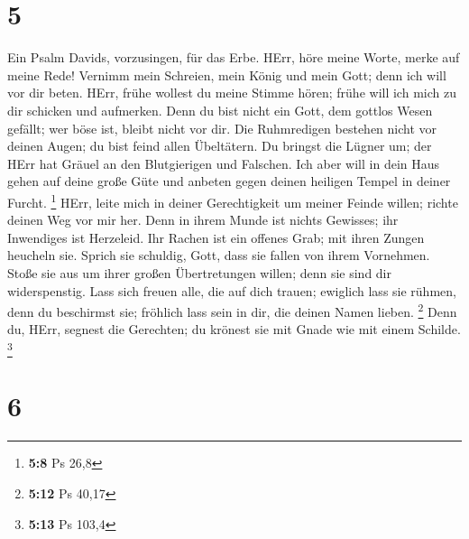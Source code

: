 \hypertarget{section-3}{%
\section{5}\label{section-3}}

 Ein Psalm Davids, vorzusingen, für das Erbe. 
HErr, höre meine Worte, merke auf meine Rede!  Vernimm mein
Schreien, mein König und mein Gott; denn ich will vor dir beten.
 HErr, frühe wollest du meine Stimme hören; frühe will ich
mich zu dir schicken und aufmerken.  Denn du bist nicht ein
Gott, dem gottlos Wesen gefällt; wer böse ist, bleibt nicht vor dir.
 Die Ruhmredigen bestehen nicht vor deinen Augen; du bist
feind allen Übeltätern.  Du bringst die Lügner um; der HErr
hat Gräuel an den Blutgierigen und Falschen.  Ich aber will
in dein Haus gehen auf deine große Güte und anbeten gegen deinen
heiligen Tempel in deiner Furcht. \footnote{\textbf{5:8} Ps 26,8}
 HErr, leite mich in deiner Gerechtigkeit um meiner Feinde
willen; richte deinen Weg vor mir her.  Denn in ihrem Munde
ist nichts Gewisses; ihr Inwendiges ist Herzeleid. Ihr Rachen ist ein
offenes Grab; mit ihren Zungen heucheln sie.  Sprich sie
schuldig, Gott, dass sie fallen von ihrem Vornehmen. Stoße sie aus um
ihrer großen Übertretungen willen; denn sie sind dir widerspenstig.
 Lass sich freuen alle, die auf dich trauen; ewiglich lass
sie rühmen, denn du beschirmst sie; fröhlich lass sein in dir, die
deinen Namen lieben. \footnote{\textbf{5:12} Ps 40,17} 
Denn du, HErr, segnest die Gerechten; du krönest sie mit Gnade wie mit
einem Schilde. \footnote{\textbf{5:13} Ps 103,4}

\hypertarget{section-4}{%
\section{6}\label{section-4}}

